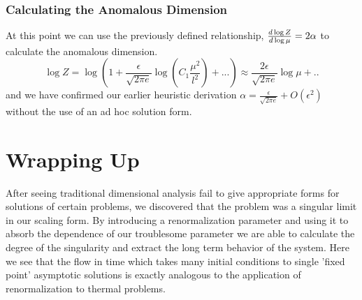 \subsubsection{Calculating the Anomalous Dimension}

At this point we can use the previously defined relationship,
\(\frac{d \log Z}{d \log \mu} = 2\alpha \) to calculate the anomalous dimension.
\[\log Z = \log\left(1 + \frac{\epsilon}{\sqrt{2\pi e}} \log \left(C_1\frac{\mu^2}{l^2}\right) + ... \right) \approx \frac{2\epsilon}{\sqrt{2\pi e}}\log \mu + ..\]
and we have confirmed our earlier heuristic derivation $\alpha = \frac{\epsilon}{\sqrt{2\pi e}} + O(\epsilon^2)$
without the use of an ad hoc solution form.

\section{Wrapping Up}

After seeing traditional dimensional analysis fail to give appropriate forms for solutions
of certain problems, we discovered that the problem was a singular limit in our scaling form.
By introducing a renormalization parameter and using it to absorb the dependence of our
troublesome parameter we are able to calculate the degree of the singularity and extract
the long term behavior of the system.  Here we see that the flow in time which takes many initial
conditions to single 'fixed point' asymptotic solutions is exactly analogous to the application
of renormalization to thermal problems.



